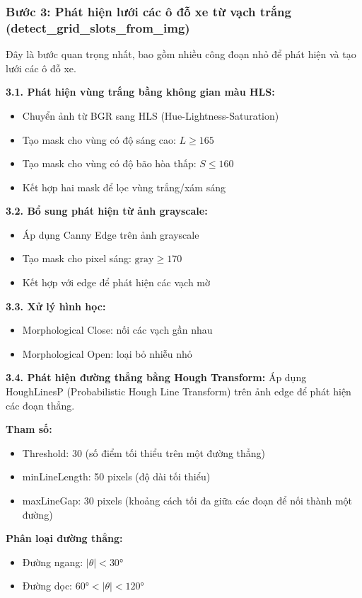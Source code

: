 \subsubsection*{Bước 3: Phát hiện lưới các ô đỗ xe từ vạch trắng (detect\_grid\_slots\_from\_img)}
Đây là bước quan trọng nhất, bao gồm nhiều công đoạn nhỏ để phát hiện và tạo lưới các ô đỗ xe.

\textbf{3.1. Phát hiện vùng trắng bằng không gian màu HLS:}
\begin{itemize}
    \item Chuyển ảnh từ BGR sang HLS (Hue-Lightness-Saturation)
    \item Tạo mask cho vùng có độ sáng cao: $L \geq 165$
    \item Tạo mask cho vùng có độ bão hòa thấp: $S \leq 160$
    \item Kết hợp hai mask để lọc vùng trắng/xám sáng
\end{itemize}

\textbf{3.2. Bổ sung phát hiện từ ảnh grayscale:}
\begin{itemize}
    \item Áp dụng Canny Edge trên ảnh grayscale
    \item Tạo mask cho pixel sáng: $\text{gray} \geq 170$
    \item Kết hợp với edge để phát hiện các vạch mờ
\end{itemize}

\textbf{3.3. Xử lý hình học:}
\begin{itemize}
    \item Morphological Close: nối các vạch gần nhau
    \item Morphological Open: loại bỏ nhiễu nhỏ
\end{itemize}

\textbf{3.4. Phát hiện đường thẳng bằng Hough Transform:}
Áp dụng HoughLinesP (Probabilistic Hough Line Transform) trên ảnh edge để phát hiện các đoạn thẳng.

\textbf{Tham số:}
\begin{itemize}
    \item Threshold: 30 (số điểm tối thiểu trên một đường thẳng)
    \item minLineLength: 50 pixels (độ dài tối thiểu)
    \item maxLineGap: 30 pixels (khoảng cách tối đa giữa các đoạn để nối thành một đường)
\end{itemize}

\textbf{Phân loại đường thẳng:}
\begin{itemize}
    \item Đường ngang: $|\theta| < 30°$
    \item Đường dọc: $60° < |\theta| < 120°$
\end{itemize}

